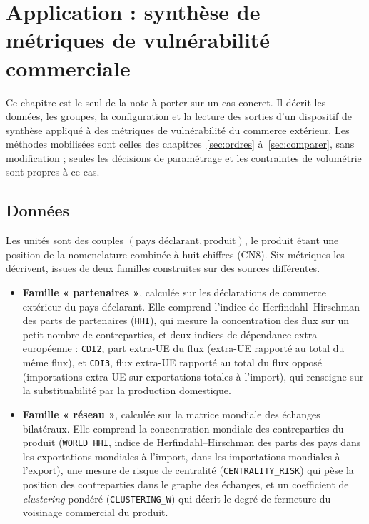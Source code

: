 \documentclass[11pt,a4paper]{article}
\theoremstyle{definition}
\theoremstyle{remark}
\begin{document}
\section{Application : synthèse de métriques de vulnérabilité commerciale}
\label{sec:application}

\medskip

Ce chapitre est le seul de la note à porter sur un cas concret. Il décrit les données, les
groupes, la configuration et la lecture des sorties d'un dispositif de synthèse appliqué à
des métriques de vulnérabilité du commerce extérieur. Les méthodes mobilisées sont celles
des chapitres~\ref{sec:ordres} à~\ref{sec:comparer}, sans modification ; seules les
décisions de paramétrage et les contraintes de volumétrie sont propres à ce cas.

\bigskip

\subsection{Données}
\label{sec:app-donnees}

\medskip

Les unités sont des couples $(\text{pays déclarant}, \text{produit})$, le produit étant
une position de la nomenclature combinée à huit chiffres (CN8). Six métriques les
décrivent, issues de deux familles construites sur des sources différentes.

\medskip

\begin{itemize}[nosep,leftmargin=1.4em]
  \item \textbf{Famille « partenaires »}, calculée sur les déclarations de commerce
  extérieur du pays déclarant. Elle comprend l'indice de Herfindahl--Hirschman des parts de
  partenaires (\texttt{HHI}), qui mesure la concentration des flux sur un petit nombre de
  contreparties, et deux indices de dépendance extra-européenne : \texttt{CDI2}, part
  extra-UE du flux (extra-UE rapporté au total du même flux), et \texttt{CDI3}, flux
  extra-UE rapporté au total du flux opposé (importations extra-UE sur exportations totales
  à l'import), qui renseigne sur la substituabilité par la production domestique.
  \item \textbf{Famille « réseau »}, calculée sur la matrice mondiale des échanges
  bilatéraux. Elle comprend la concentration mondiale des contreparties du produit
  (\texttt{WORLD\_HHI}, indice de Herfindahl--Hirschman des parts des pays dans les
  exportations mondiales à l'import, dans les importations mondiales à l'export), une
  mesure de risque de centralité (\texttt{CENTRALITY\_RISK}) qui pèse la position des
  contreparties dans le graphe des échanges, et un coefficient de \emph{clustering} pondéré
  (\texttt{CLUSTERING\_W}) qui décrit le degré de fermeture du voisinage commercial du
  produit.
\end{itemize}
\end{document}
